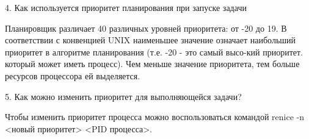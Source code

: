 4. Как используется приоритет планирования при запуске задачи

Планировщик различает 40 различных уровней приоритета: от -20 до 19. В  соответствии  с  конвенцией UNIX наименьшее  значение  означает наибольший приоритет в алгоритме планирования (т.е. -20 - это самый высо-кий приоритет. который может иметь процесс). Чем меньше значение приоритета, тем больше ресурсов процессора ей выделяется.

5. Как можно изменить приоритет для выполняющейся задачи?

Чтобы изменить приоритет процесса можно воспользоваться командой renice -n <новый приоритет> <PID процесса>.